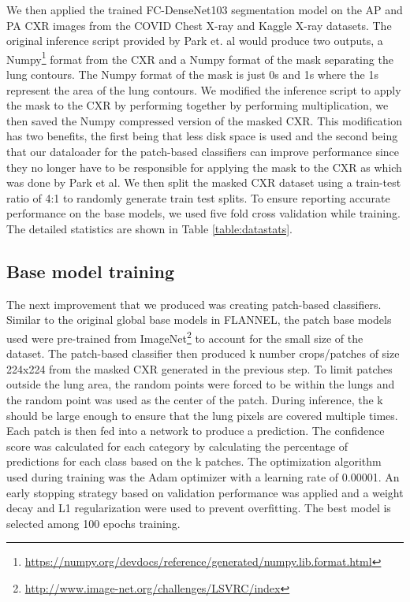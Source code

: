 \documentclass{sigkddExp}
\begin{document}
We then applied the trained FC-DenseNet103 segmentation model on the AP and PA
CXR images from the COVID Chest X-ray and Kaggle X-ray datasets. The original
inference script provided by Park et. al would produce two outputs, a Numpy\footnote{
    \url{https://numpy.org/devdocs/reference/generated/numpy.lib.format.html}} format
from the CXR and a Numpy format of the mask separating the lung
contours. The Numpy format of the mask is just 0s and 1s where the 1s
represent the area of the lung contours.  We modified the inference script to
apply the mask to the CXR by performing together by performing multiplication,
we then saved the Numpy compressed version of the masked CXR. This modification
has two benefits, the first being that less disk space is used and the second
being that our dataloader for the patch-based classifiers can improve
performance since they no longer have to be responsible for applying the mask to
the CXR as which was done by Park et al. We then split the masked CXR dataset
using a train-test ratio of 4:1 to randomly generate train test splits. To
ensure reporting accurate performance on the base models, we used five fold
cross validation while training. The detailed statistics are shown in Table
\ref{table:datastats}.

\subsection{Base model training}
The next improvement that we produced was creating patch-based classifiers.
Similar to the original global base models in FLANNEL, the patch base models
used were pre-trained from
ImageNet\footnote{\url{http://www.image-net.org/challenges/LSVRC/index}} to account
for the small size of the dataset. The patch-based classifier then produced k
number crops/patches of size 224x224 from the masked CXR generated in the
previous step. To limit patches outside the lung area, the random points were
forced to be within the lungs and the random point was used as the center of the
patch. During inference, the k should be large enough to ensure that the lung
pixels are covered multiple times. Each patch is then fed into a network to
produce a prediction. The confidence score was calculated for each category by
calculating the percentage of predictions for each class based on the k patches.
The optimization algorithm used during training was the Adam optimizer with a
learning rate of 0.00001. An early stopping strategy based on validation
performance was applied and a weight decay and L1 regularization were used to
prevent overfitting. The best model is selected among 100 epochs training.
\end{document}
